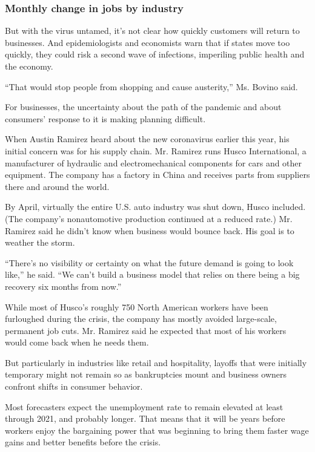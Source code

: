 \hypertarget{monthly-change-in-jobs-by-industry}{%
\subsubsection{Monthly change in jobs by
industry}\label{monthly-change-in-jobs-by-industry}}

But with the virus untamed, it's not clear how quickly customers will
return to businesses. And epidemiologists and economists warn that if
states move too quickly, they could risk a second wave of infections,
imperiling public health and the economy.

``That would stop people from shopping and cause austerity,'' Ms. Bovino
said.

For businesses, the uncertainty about the path of the pandemic and about
consumers' response to it is making planning difficult.

When Austin Ramirez heard about the new coronavirus earlier this year,
his initial concern was for his supply chain. Mr. Ramirez runs Husco
International, a manufacturer of hydraulic and electromechanical
components for cars and other equipment. The company has a factory in
China and receives parts from suppliers there and around the world.

By April, virtually the entire U.S. auto industry was shut down, Husco
included. (The company's nonautomotive production continued at a reduced
rate.) Mr. Ramirez said he didn't know when business would bounce back.
His goal is to weather the storm.

``There's no visibility or certainty on what the future demand is going
to look like,'' he said. ``We can't build a business model that relies
on there being a big recovery six months from now.''

While most of Husco's roughly 750 North American workers have been
furloughed during the crisis, the company has mostly avoided
large-scale, permanent job cuts. Mr. Ramirez said he expected that most
of his workers would come back when he needs them.

But particularly in industries like retail and hospitality, layoffs that
were initially temporary might not remain so as bankruptcies mount and
business owners confront shifts in consumer behavior.

Most forecasters expect the unemployment rate to remain elevated at
least through 2021, and probably longer. That means that it will be
years before workers enjoy the bargaining power that was beginning to
bring them faster wage gains and better benefits before the crisis.

